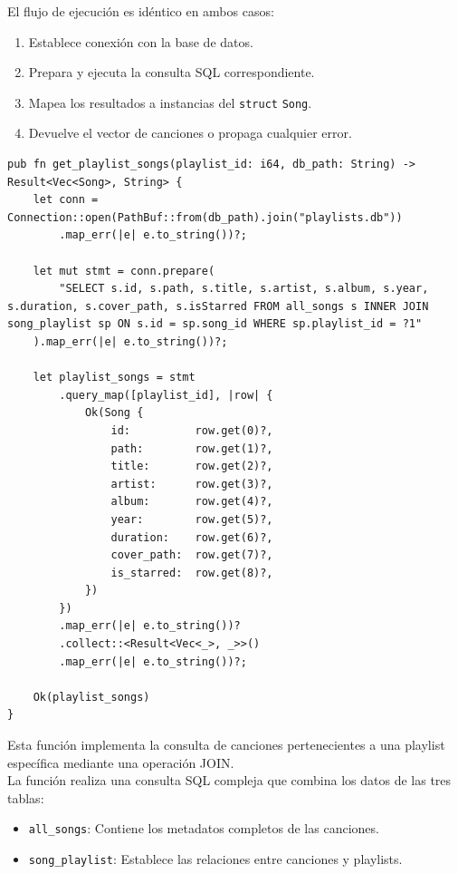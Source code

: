 \documentclass[11pt, a4paper]{article}
\begin{document}
            El flujo de ejecución es idéntico en ambos casos:
            \begin{enumerate}
              \item Establece conexión con la base de datos.
              \item Prepara y ejecuta la consulta SQL correspondiente.
              \item Mapea los resultados a instancias del \verb|struct| \verb|Song|.
              \item Devuelve el vector de canciones o propaga cualquier error.
            \end{enumerate}

            \begin{lstlisting}[caption={fn get\_playlist\_songs()}]
pub fn get_playlist_songs(playlist_id: i64, db_path: String) -> Result<Vec<Song>, String> {
    let conn = Connection::open(PathBuf::from(db_path).join("playlists.db"))
        .map_err(|e| e.to_string())?;

    let mut stmt = conn.prepare(
        "SELECT s.id, s.path, s.title, s.artist, s.album, s.year, s.duration, s.cover_path, s.isStarred FROM all_songs s INNER JOIN song_playlist sp ON s.id = sp.song_id WHERE sp.playlist_id = ?1"
    ).map_err(|e| e.to_string())?;

    let playlist_songs = stmt
        .query_map([playlist_id], |row| {
            Ok(Song {
                id:          row.get(0)?,
                path:        row.get(1)?,
                title:       row.get(2)?,
                artist:      row.get(3)?,
                album:       row.get(4)?,
                year:        row.get(5)?,
                duration:    row.get(6)?,
                cover_path:  row.get(7)?,
                is_starred:  row.get(8)?,
            })
        })
        .map_err(|e| e.to_string())?
        .collect::<Result<Vec<_>, _>>()
        .map_err(|e| e.to_string())?;

    Ok(playlist_songs)
}
            \end{lstlisting}

            Esta función implementa la consulta de canciones pertenecientes a una playlist específica mediante una operación JOIN. \\

            La función realiza una consulta SQL compleja que combina los datos de las tres tablas:

            \begin{itemize}
              \item \verb|all_songs|: Contiene los metadatos completos de las canciones.
              \item \verb|song_playlist|: Establece las relaciones entre canciones y playlists.
            \end{itemize}
\end{document}
